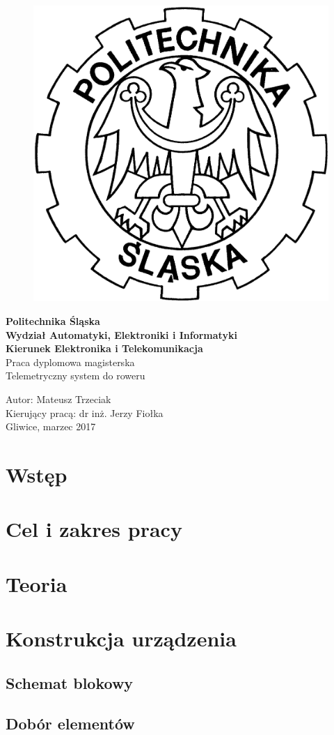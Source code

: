 \documentclass[12pt,a4paper]{report}
\begin{document}
\hspace{2cm}%
\begin{figure}[!t]
\centering
\includegraphics[width=2.5 cm, height=2.5 cm]{Obrazy/godlo_polibudy} 
\end{figure}
\begin{center}
{\Large\textbf{Politechnika Śląska\\
Wydział Automatyki, Elektroniki i Informatyki
\\[0.3cm]Kierunek Elektronika i Telekomunikacja}}
\\[3.5cm]
{\Large Praca dyplomowa magisterska}
\\[3cm] 
{\large Telemetryczny system do roweru\\[4.5cm] }
\end{center}
\begin{flushleft}
{\large Autor: Mateusz Trzeciak\\
Kierujący pracą: dr inż. Jerzy Fiołka
\\[3cm]Gliwice, marzec 2017}
\end{flushleft}
\tableofcontents	%

\chapter{Wstęp} \label{rozdz.wstep} 


\chapter{Cel i zakres pracy} \label{etykietarozdzialu2}


\chapter{Teoria}


\chapter{Konstrukcja urządzenia}
\section{Schemat blokowy}
\section{Dobór elementów}
\end{document}
